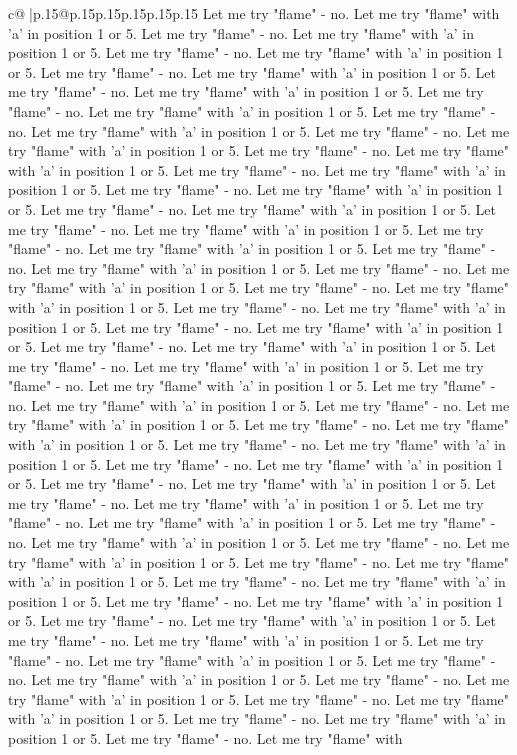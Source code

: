 \documentclass{article}
\begin{document}
{\begin{supertabular}{c@{$\;$}|p{.15\linewidth}@{}p{.15\linewidth}p{.15\linewidth}p{.15\linewidth}p{.15\linewidth}p{.15\linewidth}}
{{{Let me try "flame" {-} no. Let me try "flame" with 'a' in position 1 or 5. Let me try "flame" {-} no. Let me try "flame" with 'a' in position 1 or 5. Let me try "flame" {-} no. Let me try "flame" with 'a' in position 1 or 5. Let me try "flame" {-} no. Let me try "flame" with 'a' in position 1 or 5. Let me try "flame" {-} no. Let me try "flame" with 'a' in position 1 or 5. Let me try "flame" {-} no. Let me try "flame" with 'a' in position 1 or 5. Let me try "flame" {-} no. Let me try "flame" with 'a' in position 1 or 5. Let me try "flame" {-} no. Let me try "flame" with 'a' in position 1 or 5. Let me try "flame" {-} no. Let me try "flame" with 'a' in position 1 or 5. Let me try "flame" {-} no. Let me try "flame" with 'a' in position 1 or 5. Let me try "flame" {-} no. Let me try "flame" with 'a' in position 1 or 5. Let me try "flame" {-} no. Let me try "flame" with 'a' in position 1 or 5. Let me try "flame" {-} no. Let me try "flame" with 'a' in position 1 or 5. Let me try "flame" {-} no. Let me try "flame" with 'a' in position 1 or 5. Let me try "flame" {-} no. Let me try "flame" with 'a' in position 1 or 5. Let me try "flame" {-} no. Let me try "flame" with 'a' in position 1 or 5. Let me try "flame" {-} no. Let me try "flame" with 'a' in position 1 or 5. Let me try "flame" {-} no. Let me try "flame" with 'a' in position 1 or 5. Let me try "flame" {-} no. Let me try "flame" with 'a' in position 1 or 5. Let me try "flame" {-} no. Let me try "flame" with 'a' in position 1 or 5. Let me try "flame" {-} no. Let me try "flame" with 'a' in position 1 or 5. Let me try "flame" {-} no. Let me try "flame" with 'a' in position 1 or 5. Let me try "flame" {-} no. Let me try "flame" with 'a' in position 1 or 5. Let me try "flame" {-} no. Let me try "flame" with 'a' in position 1 or 5. Let me try "flame" {-} no. Let me try "flame" with 'a' in position 1 or 5. Let me try "flame" {-} no. Let me try "flame" with 'a' in position 1 or 5. Let me try "flame" {-} no. Let me try "flame" with 'a' in position 1 or 5. Let me try "flame" {-} no. Let me try "flame" with 'a' in position 1 or 5. Let me try "flame" {-} no. Let me try "flame" with 'a' in position 1 or 5. Let me try "flame" {-} no. Let me try "flame" with 'a' in position 1 or 5. Let me try "flame" {-} no. Let me try "flame" with 'a' in position 1 or 5. Let me try "flame" {-} no. Let me try "flame" with 'a' in position 1 or 5. Let me try "flame" {-} no. Let me try "flame" with 'a' in position 1 or 5. Let me try "flame" {-} no. Let me try "flame" with 'a' in position 1 or 5. Let me try "flame" {-} no. Let me try "flame" with 'a' in position 1 or 5. Let me try "flame" {-} no. Let me try "flame" with 'a' in position 1 or 5. Let me try "flame" {-} no. Let me try "flame" with 'a' in position 1 or 5. Let me try "flame" {-} no. Let me try "flame" with 'a' in position 1 or 5. Let me try "flame" {-} no. Let me try "flame" with 'a' in position 1 or 5. Let me try "flame" {-} no. Let me try "flame" with 'a' in position 1 or 5. Let me try "flame" {-} no. Let me try "flame" with 'a' in position 1 or 5. Let me try "flame" {-} no. Let me try "flame" with 'a' in position 1 or 5. Let me try "flame" {-} no. Let me try "flame" with }}}
\end{supertabular}}
\end{document}
